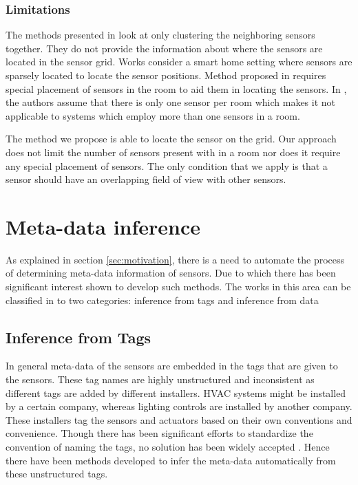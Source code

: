 \subsubsection*{Limitations}
The methods presented in \cite{Hong:2013:TAS:2528282.2528302,doi:10.1061/9780784413616.226,Koc:2014:CLC:2674061.2674075,muller2014automated} look at only clustering the neighboring sensors together. They do not provide the information about where the sensors are located in the sensor grid. Works \cite{ellis2012creating,Lu:2014:SBS:2648771.2629441,muller2014automated} consider a smart home setting where sensors are sparsely located to locate the sensor positions. Method proposed in \cite{Lu:2014:SBS:2648771.2629441} requires special placement of sensors in the room to aid them in locating the sensors. In \cite{ellis2012creating}, the authors assume that there is only one sensor per room which makes it not applicable to systems which employ more than one sensors in a room. 

The method we propose is able to locate the sensor on the grid. Our approach does not limit the number of sensors present with in a room nor does it require any special placement of sensors. The only condition that we apply is that a sensor should have an overlapping field of view with other sensors.


\section{Meta-data inference}

As explained in section \ref{sec:motivation}, there is a need to automate the process of determining meta-data information of sensors. Due to which there has been significant interest shown to develop such methods. The works in this area can be classified in to two categories: inference from tags and inference from data
\subsection{Inference from Tags}
In general meta-data of the sensors are embedded in the tags that are given to the sensors. These tag names are highly unstructured and inconsistent as different tags are added by different installers. HVAC systems might be installed by a certain company, whereas lighting controls are installed by another company. These installers tag the sensors and actuators based on their own conventions and convenience. Though there has been significant efforts to standardize the convention of naming the tags, no solution has been widely accepted \cite{gao2015data}. Hence there have been methods developed to infer the meta-data automatically from these unstructured tags.


